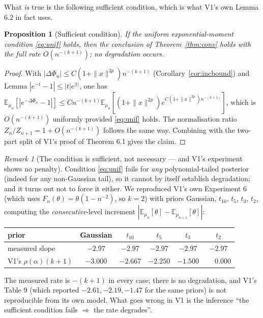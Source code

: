 \documentclass[11pt]{article}
\newtheorem{proposition}[theorem]{Proposition}
\theoremstyle{definition}
\theoremstyle{remark}
\newtheorem{remark}[theorem]{Remark}
\newcommand{\E}{\mathbb{E}}
\begin{document}
What \emph{is} true is the following sufficient condition, which is what V1's own Lemma 6.2 in fact
uses.

\begin{proposition}[Sufficient condition]\label{prop:suff}
If the uniform exponential-moment condition \eqref{eq:unif} holds, then the conclusion of
Theorem~\ref{thm:conv} holds with the full rate $O(n^{-(k+1)})$; no degradation occurs.
\end{proposition}
\begin{proof}
With $|\Delta\Phi_n|\le C(1+\|x\|^{2p})n^{-(k+1)}$ (Corollary~\ref{cor:incbound}) and Lemma
$|e^{-t}-1|\le|t|e^{|t|}$, one has $\E_{\mu_n}[|e^{-\Delta\Phi_n}-1|]
\le Cn^{-(k+1)}\E_{\mu_n}[(1+\|x\|^{2p})e^{C(1+\|x\|^{2p})n^{-(k+1)}}]$, which is
$O(n^{-(k+1)})$ uniformly provided \eqref{eq:unif} holds. The normalisation ratio
$Z_n/Z_{n+1}=1+O(n^{-(k+1)})$ follows the same way. Combining with the two-part split of V1's
proof of Theorem 6.1 gives the claim.
\end{proof}

\begin{remark}[The condition is sufficient, not necessary --- and V1's experiment shows no penalty]
Condition \eqref{eq:unif} fails for \emph{any} polynomial-tailed posterior (indeed for any
non-Gaussian tail), so it cannot by itself establish degradation; and it turns out not to force it
either. We reproduced V1's own Experiment 6 (which uses $F_n(\theta)=\theta(1-n^{-2})$, so $k=2$)
with priors Gaussian, $t_{10}$, $t_5$, $t_3$, $t_2$, computing the \emph{consecutive}-level
increment $|\E_{\mu_n}[\theta]-\E_{\mu_{n+1}}[\theta]|$:
\begin{center}
\begin{tabular}{lccccc}
\toprule
prior & Gaussian & $t_{10}$ & $t_5$ & $t_3$ & $t_2$ \\
\midrule
measured slope & $-2.97$ & $-2.97$ & $-2.97$ & $-2.97$ & $-2.97$ \\
V1's $\rho(\alpha)(k+1)$ & $-3.000$ & $-2.667$ & $-2.250$ & $-1.500$ & $\phantom{-}0.000$ \\
\bottomrule
\end{tabular}
\end{center}
The measured rate is $-(k+1)$ in every case; there is no degradation, and V1's Table 9 (which
reported $-2.61,-2.19,-1.47$ for the same priors) is not reproducible from its own model. What goes
wrong in V1 is the inference ``the sufficient condition fails $\Rightarrow$ the rate degrades''.
\end{remark}
\end{document}

